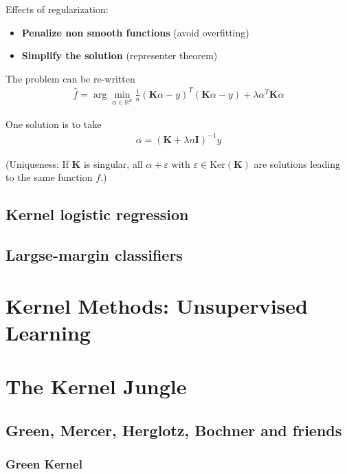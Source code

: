 \documentclass[10pt]{article}
\begin{document}
Effects of regularization: 
\begin{itemize}
  \item \textbf{Penalize non smooth functions} (avoid overfitting)
  \item \textbf{Simplify the solution} (representer theorem)
\end{itemize}

The problem can be re-written 
\begin{align*}
  \hat{f} = \arg\min_{\alpha \in \mathbb{R}^n}\frac{1}{n}
  (\mathbf{K}\alpha - y)^T (\mathbf{K}\alpha - y) + \lambda\alpha^T\mathbf{K}
  \alpha
\end{align*}

One solution is to take 
\begin{align*}
  \alpha = (\mathbf{K} + \lambda n \mathbf{I})^{-1} y
\end{align*}

(Uniqueness: If $\mathbf{K}$ is singular, all $\alpha + \varepsilon$ with 
$\varepsilon \in \text{Ker}(\mathbf{K})$ are solutions leading to the same 
function $f$.)

\subsection{Kernel logistic regression}



\subsection{Largse-margin classifiers}

\section{Kernel Methods: Unsupervised Learning}

\section{The Kernel Jungle}
\subsection{Green, Mercer, Herglotz, Bochner and friends}

\subsubsection{Green Kernel}
\end{document}
